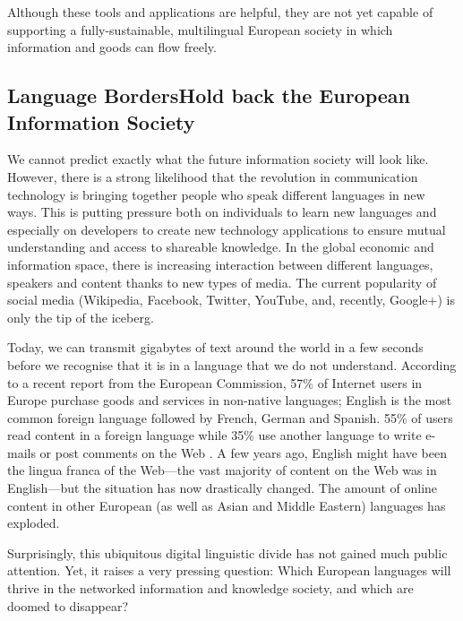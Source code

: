 \begin{multicols}{2}
Although these tools and applications are helpful, they are not yet capable of supporting a fully-sustainable, multilingual European society in which information and goods can flow freely.

\subsection[Language Borders Hold back the European Information Society]{Language Borders\newline Hold back the European Information Society}

We cannot predict exactly what the future information society will look like. However, there is a strong likelihood that the revolution in communication technology is bringing together people who speak different languages in new ways. This is putting pressure both on individuals to learn new languages and especially on developers to create new technology applications to ensure mutual understanding and access to shareable knowledge. In the global economic and information space, there is increasing interaction between different languages, speakers and content thanks to new types of media. The current popularity of social media (Wikipedia, Facebook, Twitter, YouTube, and, recently, Google+) is only the tip of the iceberg.


Today, we can transmit gigabytes of text around the world in a few seconds before we recognise that it is in a language that we do not understand. According to a recent report from the European Commission, 57\% of Internet users in Europe purchase goods and services in non-native languages; English is the most common foreign language followed by French, German and Spanish. 55\% of users read content in a foreign language while 35\% use another language to write e-mails or post comments on the Web \cite{EC1}. A few years ago, English might have been the lingua franca of the Web—the vast majority of content on the Web was in English—but the situation has now drastically changed. The amount of online content in other European (as well as Asian and Middle Eastern) languages has exploded.

Surprisingly, this ubiquitous digital linguistic divide has not gained much public attention. Yet, it raises a very pressing question: Which European languages will thrive in the networked information and knowledge society, and which are doomed to disappear?


\end{multicols}
